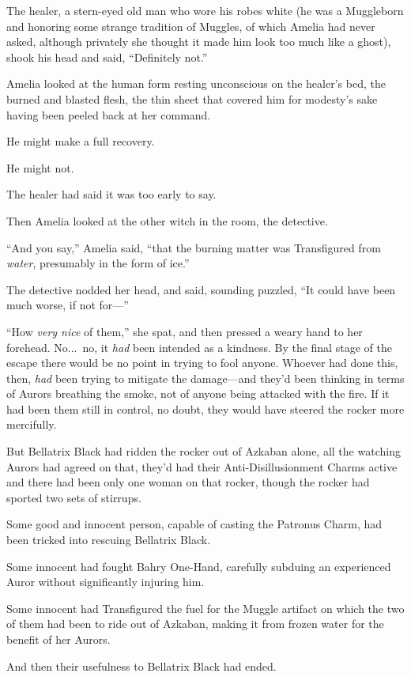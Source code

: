 The healer, a stern-eyed old man who wore his robes white (he was a Muggleborn and honoring some strange tradition of Muggles, of which Amelia had never asked, although privately she thought it made him look too much like a ghost), shook his head and said, “Definitely not.”

Amelia looked at the human form resting unconscious on the healer’s bed, the burned and blasted flesh, the thin sheet that covered him for modesty’s sake having been peeled back at her command.

He might make a full recovery.

He might not.

The healer had said it was too early to say.

Then Amelia looked at the other witch in the room, the detective.

“And you say,” Amelia said, “that the burning matter was Transfigured from \emph{water}, presumably in the form of ice.”

The detective nodded her head, and said, sounding puzzled, “It could have been much worse, if not for—”

“How \emph{very nice} of them,” she spat, and then pressed a weary hand to her forehead. No...\ no, it \emph{had} been intended as a kindness. By the final stage of the escape there would be no point in trying to fool anyone. Whoever had done this, then, \emph{had} been trying to mitigate the damage—and they’d been thinking in terms of Aurors breathing the smoke, not of anyone being attacked with the fire. If it had been them still in control, no doubt, they would have steered the rocker more mercifully.

But Bellatrix Black had ridden the rocker out of Azkaban alone, all the watching Aurors had agreed on that, they’d had their Anti-Disillusionment Charms active and there had been only one woman on that rocker, though the rocker had sported two sets of stirrups.

Some good and innocent person, capable of casting the Patronus Charm, had been tricked into rescuing Bellatrix Black.

Some innocent had fought Bahry One-Hand, carefully subduing an experienced Auror without significantly injuring him.

Some innocent had Transfigured the fuel for the Muggle artifact on which the two of them had been to ride out of Azkaban, making it from frozen water for the benefit of her Aurors.

And then their usefulness to Bellatrix Black had ended.

